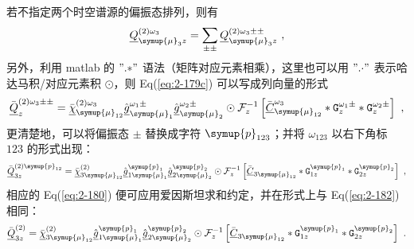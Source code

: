 若不指定两个时空谱源的偏振态排列，则有
\begin{equation} \label{eq:2-180}
	\abovedisplayskip=13pt
	\belowdisplayskip=13pt
	\underline{Q}^{(2)\omega_3}_{{\symup{\mu}}_{3} z} = \sum_{\pm\pm} \underline{Q}^{(2)\omega_3\pm\pm}_{{\symup{\mu}}_{3} z} ~,
\end{equation}
另外，利用 matlab 的 $"{.*}"$ 语法（矩阵对应元素相乘），这里也可以用 $"{.\cdot}"$ 表示哈达马积/对应元素积 $\odot$，则 Eq(\ref{eq:2-179c}) 可以写成列向量的形式 %
\begin{equation} \label{eq:2-181}
	\abovedisplayskip=13pt
	\belowdisplayskip=13pt
	\bar{\underline{Q}}^{(2)\omega_3\pm\pm}_{z} = \bar{\underline{\chi}}^{(2)\omega_3}_{{\symup{\mu}}_{12}} \hat{\underline{g}}^{\omega_1\pm}_{{\symup{\mu}}_1} \hat{\underline{g}}^{\omega_2\pm}_{{\symup{\mu}}_2} \odot \mathcal F^{-1}_{z} \left[ \bar{\underline{C}}^{\omega_3}_{{\symup{\mu}}_{12}} * {\mathtt{G}}^{\omega_1\pm}_{z} * {\mathtt{G}}^{\omega_2\pm}_{z} \right] ~,
\end{equation}
更清楚地，可以将偏振态 $\pm$ 替换成字符 $\symup{p}_{123}$；并将 $\omega_{123}$ 以右下角标 $123$ 的形式出现：
\begin{equation} \label{eq:2-182}
	\abovedisplayskip=13pt
	\belowdisplayskip=13pt
	\bar{\underline{Q}}^{(2){\symup{p}}_{12}}_{3z} = \bar{\underline{\chi}}^{(2)}_{3{\symup{\mu}}_{12}} \hat{\underline{g}}^{\symup{p}_{1}}_{1{\symup{\mu}}_1} \hat{\underline{g}}^{\symup{p}_{2}}_{2{\symup{\mu}}_2} \odot \mathcal F^{-1}_{z} \left[ \bar{\underline{C}}_{3{\symup{\mu}}_{12}} * {\mathtt{G}}^{\symup{p}_{1}}_{1z} * {\mathtt{G}}^{\symup{p}_{2}}_{2z} \right] ~,
\end{equation}
相应的 Eq(\ref{eq:2-180}) 便可应用爱因斯坦求和约定，并在形式上与 Eq(\ref{eq:2-182}) 相同：
\begin{equation} \label{eq:2-183}
	\abovedisplayskip=13pt
	\belowdisplayskip=13pt
	\bar{\underline{Q}}^{(2)}_{3z} = \bar{\underline{\chi}}^{(2)}_{3{\symup{\mu}}_{12}} \hat{\underline{g}}^{\symup{p}_{1}}_{1{\symup{\mu}}_1} \hat{\underline{g}}^{\symup{p}_{2}}_{2{\symup{\mu}}_2} \odot \mathcal F^{-1}_{z} \left[ \bar{\underline{C}}_{3{\symup{\mu}}_{12}} * {\mathtt{G}}^{\symup{p}_{1}}_{1z} * {\mathtt{G}}^{\symup{p}_{2}}_{2z} \right] ~.
\end{equation}

